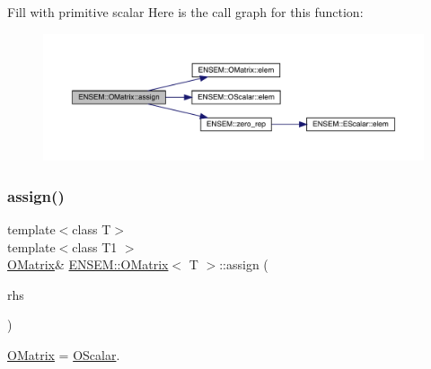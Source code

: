 Fill with primitive scalar Here is the call graph for this function\+:
\nopagebreak
\begin{figure}[H]
\begin{center}
\leavevmode
\includegraphics[width=350pt]{dd/d80/classENSEM_1_1OMatrix_af0aaac940f907eb3db104e9f57b90a4f_cgraph}
\end{center}
\end{figure}
\mbox{\label{classENSEM_1_1OMatrix_af0aaac940f907eb3db104e9f57b90a4f}} 
\subsubsection{\texorpdfstring{assign()}{assign()}\hspace{0.1cm}{\footnotesize\ttfamily [6/9]}}
{\footnotesize\ttfamily template$<$class T$>$ \\
template$<$class T1 $>$ \\
\mbox{\hyperlink{classENSEM_1_1OMatrix}{O\+Matrix}}\& \mbox{\hyperlink{classENSEM_1_1OMatrix}{E\+N\+S\+E\+M\+::\+O\+Matrix}}$<$ T $>$\+::assign (\begin{DoxyParamCaption}\item[{const \mbox{\hyperlink{classENSEM_1_1OScalar}{O\+Scalar}}$<$ T1 $>$ \&}]{rhs }\end{DoxyParamCaption})\hspace{0.3cm}{\ttfamily [inline]}}



\mbox{\hyperlink{classENSEM_1_1OMatrix}{O\+Matrix}} = \mbox{\hyperlink{classENSEM_1_1OScalar}{O\+Scalar}}. 

